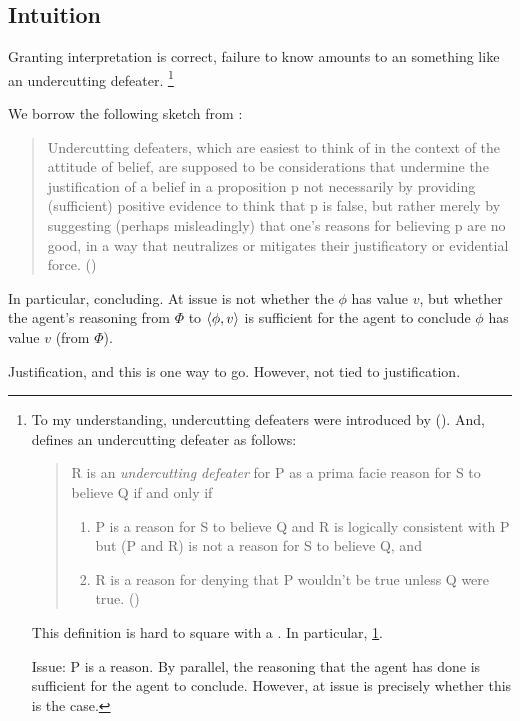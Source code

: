 \subsection{Intuition}
\label{sec:intuition-1}

\begin{note}
  Granting interpretation is correct, failure to know \fc{} amounts to an something like an undercutting defeater.%
  \footnote{
    To my understanding, undercutting defeaters were introduced by \citeauthor{Pollock:1987un} (\citeyear{Pollock:1987un}).
    And, \citeauthor{Pollock:1987un} defines an undercutting defeater as follows:
    \begin{quote}
    R is an \emph{undercutting defeater} for P as a prima facie reason for S to believe Q if and only if
    \begin{enumerate}[label=(UD\arabic*), ref=(UD\arabic*)]
    \item
      \label{pollock:ud:1}
      P is a reason for S to believe Q and R is logically consistent with P but (P and R) is not a reason for S to believe Q, and
    \item
      \label{pollock:ud:2}
      R is a reason for denying that P wouldn't be true unless Q were true.%
      \mbox{}\hfill\mbox{(\citeyear[485]{Pollock:1987un})}
    \end{enumerate}
  \end{quote}
  This definition is hard to square with a \requ{}.
  In particular, \ref{pollock:ud:1}.

  Issue: P is a reason.
  By parallel, the reasoning that the agent has done is sufficient for the agent to conclude.
  However, at issue is precisely whether this is the case.
  }

  We borrow the following sketch from \textcite{Worsnip:2018aa}:
  \begin{quote}
    Undercutting defeaters, which are easiest to think of in the context of the attitude of belief, are supposed to be considerations that undermine the justification of a belief in a proposition p not necessarily by providing (sufficient) positive evidence to think that p is false, but rather merely by suggesting (perhaps misleadingly) that one’s reasons for believing p are no good, in a way that neutralizes or mitigates their justificatory or evidential force.%
    \mbox{}\hfill\mbox{(\citeyear[29]{Worsnip:2018aa})}
  \end{quote}

  In particular, concluding.
  At issue is not whether the \(\phi\) has value \(v\), but whether the agent's reasoning from \(\Phi\) to \(\langle \phi, v \rangle\) is sufficient for the agent to conclude \(\phi\) has value \(v\) (from \(\Phi\)).

  Justification, and this is one way to go.
  However, not tied to justification.
\end{note}

